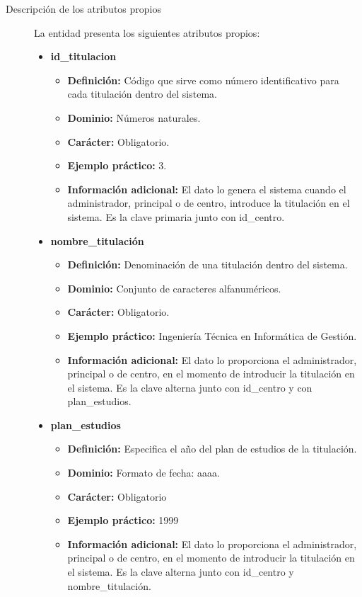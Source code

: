 \begin{description}
   \item[Descripción de los atributos propios] La entidad presenta los
   siguientes atributos propios:

   \begin{itemize}
   \item \textbf{id\_titulacion}
      \begin{itemize}
         \item \textbf{Definición:} Código que sirve como número identificativo
         para cada titulación dentro del sistema.
         \item \textbf{Dominio:} Números naturales.
         \item \textbf{Carácter:} Obligatorio.
         \item \textbf{Ejemplo práctico:} 3.
         \item \textbf{Información adicional:} El dato lo genera el sistema
         cuando el administrador, principal o de centro, introduce la titulación
         en el sistema. Es la clave primaria junto con id\_centro.
      \end{itemize}
   \item \textbf{nombre\_titulación}
      \begin{itemize}
         \item \textbf{Definición:} Denominación de una titulación dentro del sistema.
         \item \textbf{Dominio:} Conjunto de caracteres alfanuméricos.
         \item \textbf{Carácter:} Obligatorio.
         \item \textbf{Ejemplo práctico:} Ingeniería Técnica en Informática de Gestión.
         \item \textbf{Información adicional:} El dato lo proporciona el administrador, principal o de centro, en el momento de introducir la titulación en el sistema. Es la clave alterna junto con id\_centro y con plan\_estudios.
      \end{itemize}
   \item \textbf{plan\_estudios}
      \begin{itemize}
         \item \textbf{Definición:} Especifica el año del plan de estudios de la titulación.
         \item \textbf{Dominio:} Formato de fecha: aaaa.
         \item \textbf{Carácter:}  Obligatorio
         \item \textbf{Ejemplo práctico:} 1999
         \item \textbf{Información adicional:} El dato lo proporciona el administrador, principal o de
         centro, en el momento de introducir la titulación en el sistema. Es la clave alterna junto con
         id\_centro y nombre\_titulación.
      \end{itemize}
   \end{itemize}


\end{description}
